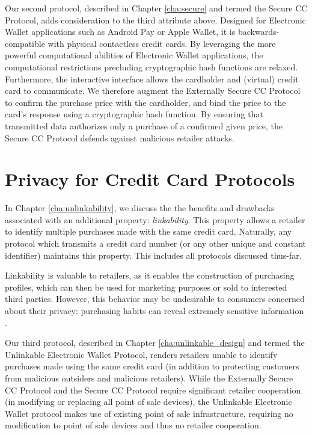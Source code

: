 Our second protocol, described in Chapter \ref{cha:secure} and termed the Secure CC Protocol, adds consideration to the third attribute above.
Designed for Electronic Wallet applications such as Android Pay or Apple Wallet, it is backwards-compatible with physical contactless credit cards.
By leveraging the more powerful computational abilities of Electronic Wallet applications, the computational restrictions precluding cryptographic hash functions are relaxed.
Furthermore, the interactive interface allows the cardholder and (virtual) credit card to communicate.
We therefore augment the Externally Secure CC Protocol to confirm the purchase price with the cardholder,
    and bind the price to the card's response using a cryptographic hash function.
By ensuring that transmitted data authorizes only a purchase of a confirmed given price,
    the Secure CC Protocol defends against malicious retailer attacks.

\section{Privacy for Credit Card Protocols}
\label{sec:intro-approach-privacy}

In Chapter \ref{cha:unlinkability}, we discuss the the benefits and drawbacks associated with an additional property: \emph{linkability}.
This property allows a retailer to identify multiple purchases made with the same credit card.
Naturally, any protocol which transmits a credit card number (or any other unique and constant identifier) maintains this property.
This includes all protocols discussed thus-far.

Linkability is valuable to retailers, as it enables the construction of purchasing profiles,
    which can then be used for marketing purposes or sold to interested third parties.
However, this behavior may be undesirable to consumers concerned about their privacy:
    purchasing habits can reveal extremely sensitive information \cite{targetpregnant}.

Our third protocol, described in Chapter \ref{cha:unlinkable_design} and termed the Unlinkable Electronic Wallet Protocol,
    renders retailers unable to identify purchases made using the same credit card (in addition to protecting customers from malicious outsiders and malicious retailers).
While the Externally Secure CC Protocol and the Secure CC Protocol require significant retailer cooperation (in modifying or replacing all point of sale devices),
    the Unlinkable Electronic Wallet protocol makes use of existing point of sale infrastructure,
    requiring no modification to point of sale devices and thus no retailer cooperation.
